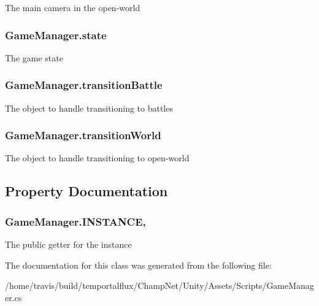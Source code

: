 The main camera in the open-\/world 

\hypertarget{class_game_manager_a8d86b330237462e38933b28276ed0e2c}{
\subsubsection[{state}]{ Game\-Manager.\-state}}\label{class_game_manager_a8d86b330237462e38933b28276ed0e2c}


The game state 

\hypertarget{class_game_manager_a1bd9eb164a33c054431f5bf8ccc8d3b8}{
\subsubsection[{transition\-Battle}]{ Game\-Manager.\-transition\-Battle}}\label{class_game_manager_a1bd9eb164a33c054431f5bf8ccc8d3b8}


The object to handle transitioning to battles 

\hypertarget{class_game_manager_a59aeb9d1bcc8580f55f3f4dcdae396fd}{
\subsubsection[{transition\-World}]{ Game\-Manager.\-transition\-World}}\label{class_game_manager_a59aeb9d1bcc8580f55f3f4dcdae396fd}


The object to handle transitioning to open-\/world 



\subsection{Property Documentation}
\hypertarget{class_game_manager_a5c1d1f77dd4a2668a47a75c934c87075}{
\subsubsection[{I\-N\-S\-T\-A\-N\-C\-E}]{ Game\-Manager.\-I\-N\-S\-T\-A\-N\-C\-E\hspace{0.3cm}{\ttfamily [static]}, {\ttfamily [get]}}}\label{class_game_manager_a5c1d1f77dd4a2668a47a75c934c87075}


The public getter for the instance 



The documentation for this class was generated from the following file\-:\begin{DoxyCompactItemize}
\item 
/home/travis/build/temportalflux/\-Champ\-Net/\-Unity/\-Assets/\-Scripts/Game\-Manager.\-cs\end{DoxyCompactItemize}
